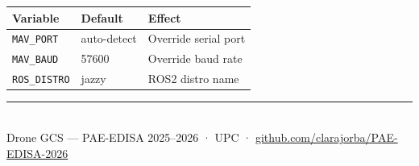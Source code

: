 \documentclass[11pt,a4paper]{article}
\begin{document}
\begin{center}
\begin{tabular}{lll}
  \toprule
  \textbf{Variable} & \textbf{Default} & \textbf{Effect} \\
  \midrule
  \texttt{MAV\_PORT} & auto-detect & Override serial port \\
  \texttt{MAV\_BAUD} & 57600 & Override baud rate \\
  \texttt{ROS\_DISTRO} & jazzy & ROS2 distro name \\
  \bottomrule
\end{tabular}
\end{center}

\vfill
\noindent\textcolor{navyblue!40}{\rule{\textwidth}{0.4pt}}\\
{\small\color{gray}
Drone GCS — PAE-EDISA 2025--2026 · UPC ·
\href{https://github.com/clarajorba/PAE-EDISA-2026}{github.com/clarajorba/PAE-EDISA-2026}}
\end{document}
